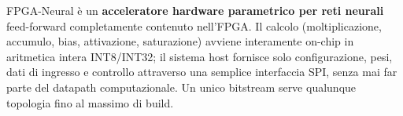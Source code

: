 \thispagestyle{plain}
\noindent
{}

\vspace{6pt}
\noindent
{\small FPGA-Neural è un \textbf{acceleratore hardware parametrico per reti neurali}
feed-forward completamente contenuto nell'FPGA. Il calcolo (moltiplicazione,
accumulo, bias, attivazione, saturazione) avviene interamente on-chip in aritmetica
intera INT8/INT32; il sistema host fornisce solo configurazione, pesi, dati di
ingresso e controllo attraverso una semplice interfaccia SPI, senza mai far parte
del datapath computazionale. Un unico bitstream serve qualunque topologia fino al
massimo di build.}

